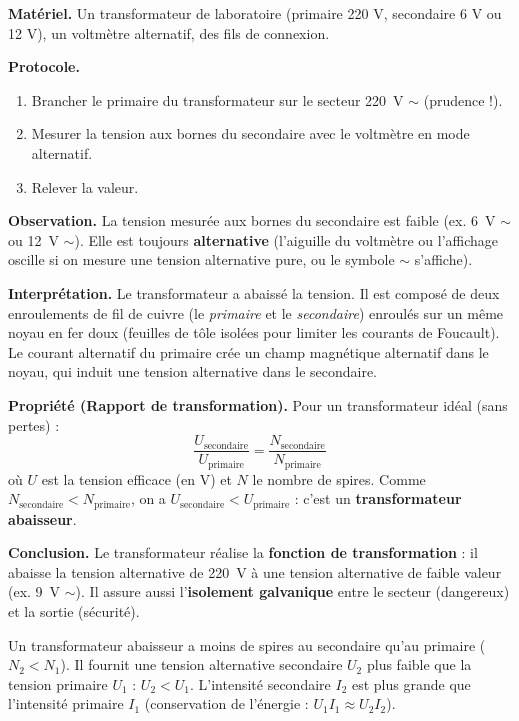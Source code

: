 \documentclass[11pt]{article}
\begin{document}
\begin{experience}
\textbf{Matériel.} Un transformateur de laboratoire (primaire 220 V, secondaire 6 V ou 12 V), un voltmètre alternatif, des fils de connexion.

\textbf{Protocole.}
\begin{enumerate}
\item Brancher le primaire du transformateur sur le secteur \SI{220}{V} $\sim$ (prudence !).
\item Mesurer la tension aux bornes du secondaire avec le voltmètre en mode alternatif.
\item Relever la valeur.
\end{enumerate}

\textbf{Observation.} La tension mesurée aux bornes du secondaire est faible (ex. \SI{6}{V} $\sim$ ou \SI{12}{V} $\sim$). Elle est toujours \textbf{alternative} (l'aiguille du voltmètre ou l'affichage oscille si on mesure une tension alternative pure, ou le symbole $\sim$ s'affiche).

\textbf{Interprétation.} Le transformateur a abaissé la tension. Il est composé de deux enroulements de fil de cuivre (le \emph{primaire} et le \emph{secondaire}) enroulés sur un même noyau en fer doux (feuilles de tôle isolées pour limiter les courants de Foucault). Le courant alternatif du primaire crée un champ magnétique alternatif dans le noyau, qui induit une tension alternative dans le secondaire.

\textbf{Propriété (Rapport de transformation).} Pour un transformateur idéal (sans pertes) :
\[
\frac{U_{\text{secondaire}}}{U_{\text{primaire}}} = \frac{N_{\text{secondaire}}}{N_{\text{primaire}}}
\]
où $U$ est la tension efficace (en V) et $N$ le nombre de spires.
Comme $N_{\text{secondaire}} < N_{\text{primaire}}$, on a $U_{\text{secondaire}} < U_{\text{primaire}}$ : c'est un \textbf{transformateur abaisseur}.

\textbf{Conclusion.} Le transformateur réalise la \textbf{fonction de transformation} : il abaisse la tension alternative de \SI{220}{V} à une tension alternative de faible valeur (ex. \SI{9}{V} $\sim$). Il assure aussi l'\textbf{isolement galvanique} entre le secteur (dangereux) et la sortie (sécurité).
\end{experience}

\begin{propriete}
Un transformateur abaisseur a moins de spires au secondaire qu'au primaire ($N_2 < N_1$). Il fournit une tension alternative secondaire $U_2$ plus faible que la tension primaire $U_1$ : $U_2 < U_1$. L'intensité secondaire $I_2$ est plus grande que l'intensité primaire $I_1$ (conservation de l'énergie : $U_1 I_1 \approx U_2 I_2$).
\end{propriete}
\end{document}
